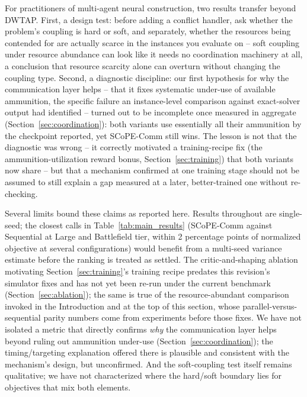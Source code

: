 For practitioners of multi-agent neural construction, two results transfer beyond DWTAP. First, a design test: before adding a conflict handler, ask whether the problem's coupling is hard or soft, and separately, whether the resources being contended for are actually scarce in the instances you evaluate on -- soft coupling under resource abundance can look like it needs no coordination machinery at all, a conclusion that resource scarcity alone can overturn without changing the coupling type. Second, a diagnostic discipline: our first hypothesis for why the communication layer helps -- that it fixes systematic under-use of available ammunition, the specific failure an instance-level comparison against exact-solver output had identified -- turned out to be incomplete once measured in aggregate (Section~\ref{sec:coordination}): both variants use essentially all their ammunition by the checkpoint reported, yet SCoPE-Comm still wins. The lesson is not that the diagnostic was wrong -- it correctly motivated a training-recipe fix (the ammunition-utilization reward bonus, Section~\ref{sec:training}) that both variants now share -- but that a mechanism confirmed at one training stage should not be assumed to still explain a gap measured at a later, better-trained one without re-checking.

Several limits bound these claims as reported here. Results throughout are single-seed; the closest calls in Table~\ref{tab:main_results} (SCoPE-Comm against Sequential at Large and Battlefield tier, within 2 percentage points of normalized objective at several configurations) would benefit from a multi-seed variance estimate before the ranking is treated as settled. The critic-and-shaping ablation motivating Section~\ref{sec:training}'s training recipe predates this revision's simulator fixes and has not yet been re-run under the current benchmark (Section~\ref{sec:ablation}); the same is true of the resource-abundant comparison invoked in the Introduction and at the top of this section, whose parallel-versus-sequential parity numbers come from experiments before those fixes. We have not isolated a metric that directly confirms \emph{why} the communication layer helps beyond ruling out ammunition under-use (Section~\ref{sec:coordination}); the timing/targeting explanation offered there is plausible and consistent with the mechanism's design, but unconfirmed. And the soft-coupling test itself remains qualitative; we have not characterized where the hard/soft boundary lies for objectives that mix both elements.

